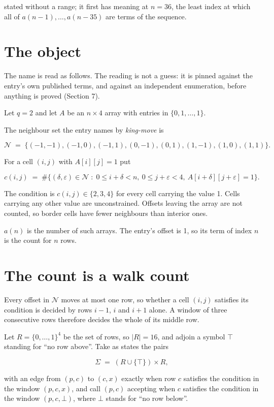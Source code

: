 \documentclass[11pt]{article}
\theoremstyle{definition}
\begin{document}
stated without a range; it first has meaning at $n = 36$, the least index at which all of $a(n-1),\dots,a(n-35)$ are terms of the sequence.

\section{The object}

The name is read as follows. The reading is not a guess: it is pinned against the entry's own published terms, and against an independent enumeration, before anything is proved (Section 7).

Let $q = 2$ and let $A$ be an $n \times 4$ array with entries in $\{0,1,\dots,1\}$.

The neighbour set the entry names by {\itshape king-move} is

\[\mathcal{N} \;=\; \{(-1,-1), (-1,0), (-1,1), (0,-1), (0,1), (1,-1), (1,0), (1,1)\}.\]

For a cell $(i,j)$ with $A[i][j] = 1$ put

\[c(i,j) \;=\; \#\bigl\{(\delta,\varepsilon)\in\mathcal{N} \;:\; 0\le i+\delta<n,\ 0\le j+\varepsilon<4,\ A[i+\delta][j+\varepsilon] = 1\bigr\}.\]

The condition is $c(i,j) \in \{2, 3, 4\}$ for every cell carrying the value 1. Cells carrying any other value are unconstrained. Offsets leaving the array are not counted, so border cells have fewer neighbours than interior ones.

$a(n)$ is the number of such arrays. The entry's offset is 1, so its term of index $n$ is the count for $n$ rows.

\section{The count is a walk count}

Every offset in $\mathcal{N}$ moves at most one row, so whether a cell $(i,j)$ satisfies its condition is decided by rows $i-1$, $i$ and $i+1$ alone. A window of three consecutive rows therefore decides the whole of its middle row.

Let $R = \{0,\dots,1\}^{4}$ be the set of rows, so $|R| = 16$, and adjoin a symbol $\top$ standing for ``no row above''. Take as states the pairs

\[\Sigma \;=\; (R \cup \{\top\}) \times R,\]

with an edge from $(p,c)$ to $(c,x)$ exactly when row $c$ satisfies the condition in the window $(p,c,x)$, and call $(p,c)$ accepting when $c$ satisfies the condition in the window $(p,c,\bot)$, where $\bot$ stands for ``no row below''.
\end{document}
